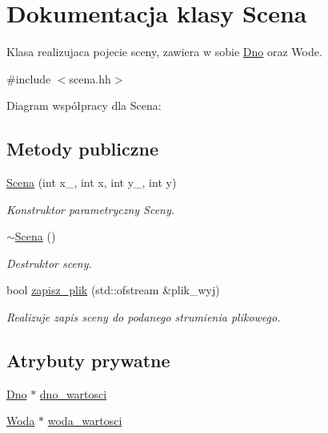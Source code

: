 \hypertarget{class_scena}{}\section{Dokumentacja klasy Scena}
\label{class_scena}


Klasa realizujaca pojecie sceny, zawiera w sobie \hyperlink{class_dno}{Dno} oraz Wode.  




{\ttfamily \#include $<$scena.\+hh$>$}



Diagram współpracy dla Scena\+:
\subsection*{Metody publiczne}
\begin{DoxyCompactItemize}
\item 
\hyperlink{class_scena_aa25d8e08524292a7305c930e2729a184}{Scena} (int x\+\_, int x, int y\+\_, int y)
\begin{DoxyCompactList}\small\item\em Konstruktor parametryczny Sceny. \end{DoxyCompactList}\item 
\hyperlink{class_scena_ad882b3d3c934c64c5e90a63246a47943}{$\sim$\+Scena} ()
\begin{DoxyCompactList}\small\item\em Destruktor sceny. \end{DoxyCompactList}\item 
bool \hyperlink{class_scena_a76bbf6eceb1bade5fd2acbdd41fa229f}{zapisz\+\_\+plik} (std\+::ofstream \&plik\+\_\+wyj)
\begin{DoxyCompactList}\small\item\em Realizuje zapis sceny do podanego strumienia plikowego. \end{DoxyCompactList}\end{DoxyCompactItemize}
\subsection*{Atrybuty prywatne}
\begin{DoxyCompactItemize}
\item 
\hyperlink{class_dno}{Dno} $\ast$ \hyperlink{class_scena_aa4deb37aaebf4a31512a4b12b8416fbb}{dno\+\_\+wartosci}
\item 
\hyperlink{class_woda}{Woda} $\ast$ \hyperlink{class_scena_ad2f6b4af02a7c8f10dabb005aae33f73}{woda\+\_\+wartosci}
\end{DoxyCompactItemize}


